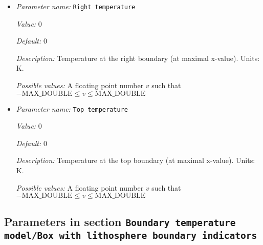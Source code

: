 \begin{itemize}
{\it Value:} 1


{\it Default:} 1


{\it Description:} Temperature at the left boundary (at minimal x-value). Units: K.


{\it Possible values:} A floating point number $v$ such that $-\text{MAX\_DOUBLE} \leq v \leq \text{MAX\_DOUBLE}$
\item {\it Parameter name:} {\tt Right temperature}
\label{parameters:Boundary temperature model/Box/Right temperature}
\label{parameters:Boundary_20temperature_20model/Box/Right_20temperature}


{\it Value:} 0


{\it Default:} 0


{\it Description:} Temperature at the right boundary (at maximal x-value). Units: K.


{\it Possible values:} A floating point number $v$ such that $-\text{MAX\_DOUBLE} \leq v \leq \text{MAX\_DOUBLE}$
\item {\it Parameter name:} {\tt Top temperature}
\label{parameters:Boundary temperature model/Box/Top temperature}
\label{parameters:Boundary_20temperature_20model/Box/Top_20temperature}


{\it Value:} 0


{\it Default:} 0


{\it Description:} Temperature at the top boundary (at maximal x-value). Units: K.


{\it Possible values:} A floating point number $v$ such that $-\text{MAX\_DOUBLE} \leq v \leq \text{MAX\_DOUBLE}$
\end{itemize}

\subsection{Parameters in section \tt Boundary temperature model/Box with lithosphere boundary indicators}
\label{parameters:Boundary_20temperature_20model/Box_20with_20lithosphere_20boundary_20indicators}

